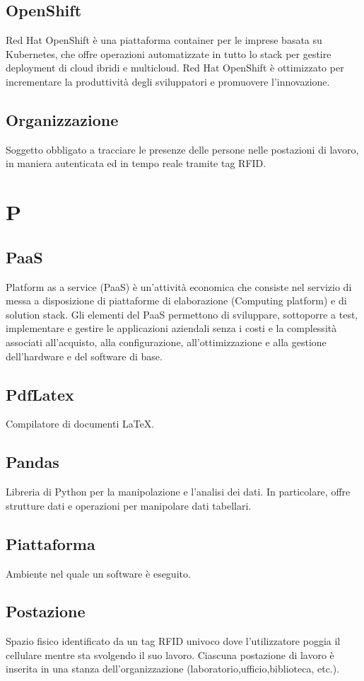 \subsection{OpenShift} Red Hat OpenShift è una piattaforma container per le imprese basata su Kubernetes, che offre operazioni automatizzate in tutto lo stack per gestire deployment di cloud ibridi e multicloud. Red Hat OpenShift è ottimizzato per incrementare la produttività degli sviluppatori e promuovere l'innovazione. 
\subsection{Organizzazione} Soggetto obbligato a tracciare le presenze delle persone nelle postazioni di lavoro, in maniera autenticata ed in tempo reale tramite tag RFID. 
\newpage \section{P}
\subsection{PaaS} Platform as a service (PaaS) è un'attività economica che consiste nel servizio di messa a disposizione di piattaforme di elaborazione (Computing platform) e di solution stack. Gli elementi del PaaS permettono di sviluppare, sottoporre a test, implementare e gestire le applicazioni aziendali senza i costi e la complessità associati all'acquisto, alla configurazione, all'ottimizzazione e alla gestione dell'hardware e del software di base.
\subsection{PdfLatex} Compilatore di documenti \LaTeX.
\subsection{Pandas} Libreria di Python per la manipolazione e l'analisi dei dati. In particolare, offre strutture dati e operazioni per manipolare dati tabellari.
\subsection{Piattaforma} Ambiente nel quale un software è eseguito.
\subsection{Postazione} Spazio fisico identificato da un tag RFID univoco dove l’utilizzatore poggia il
cellulare mentre sta svolgendo il suo lavoro. Ciascuna postazione di lavoro è inserita in una stanza
dell'organizzazione (laboratorio,ufficio,biblioteca, etc.).
